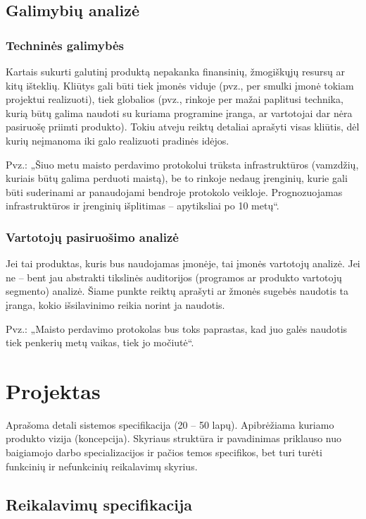 \documentclass{ktuthesis}
\begin{document}
	\subsection{Galimybių analizė}
	
	\subsubsection{Techninės galimybės}
	Kartais sukurti galutinį produktą nepakanka finansinių, žmogiškųjų resursų ar kitų išteklių. Kliūtys gali būti tiek įmonės viduje (pvz., per smulki įmonė
	tokiam projektui realizuoti), tiek globalios (pvz., rinkoje per mažai paplitusi technika, kurią būtų galima naudoti su kuriama programine įranga, ar vartotojai
	dar nėra pasiruošę priimti produkto). Tokiu atveju reiktų detaliai aprašyti visas kliūtis, dėl kurių neįmanoma iki galo realizuoti pradinės idėjos.
	
	Pvz.: „Šiuo metu maisto perdavimo protokolui trūksta infrastruktūros (vamzdžių, kuriais būtų galima perduoti maistą), be to rinkoje nedaug įrenginių, kurie gali
	būti suderinami ar panaudojami bendroje protokolo veikloje. Prognozuojamas infrastruktūros ir įrenginių išplitimas – apytiksliai po 10 metų“.
	
	\subsubsection{Vartotojų pasiruošimo analizė}
	Jei tai produktas, kuris bus naudojamas įmonėje, tai įmonės vartotojų analizė. Jei ne – bent jau abstrakti tikslinės auditorijos (programos ar produkto vartotojų
	segmento) analizė. Šiame punkte reiktų aprašyti ar žmonės sugebės naudotis ta įranga, kokio išsilavinimo reikia norint ja naudotis.
	
	Pvz.: „Maisto perdavimo protokolas bus toks paprastas, kad juo galės naudotis tiek penkerių metų vaikas, tiek jo močiutė“.
	
	\section{Projektas}
	
	Aprašoma detali sistemos specifikacija (20 – 50 lapų). Apibrėžiama kuriamo produkto vizija (koncepcija). Skyriaus struktūra ir pavadinimas priklauso nuo baigiamojo
	darbo specializacijos ir pačios temos specifikos, bet turi turėti funkcinių ir nefunkcinių reikalavimų skyrius.
	
	\subsection{Reikalavimų specifikacija}
	
\end{document}
